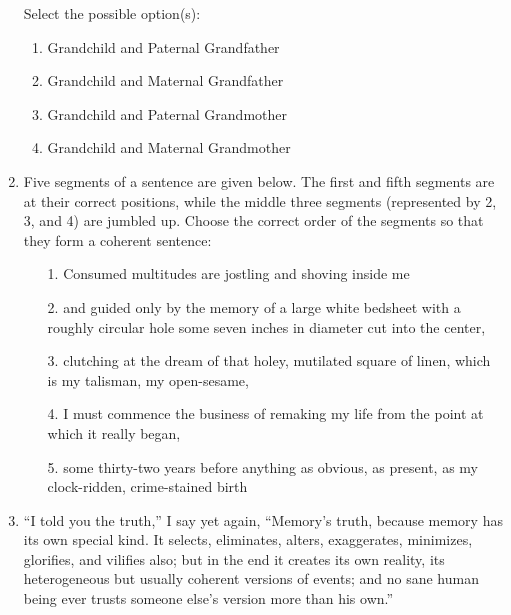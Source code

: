 \documentclass[12pt]{article}
\theoremstyle{remark}
\begin{document}
\begin{enumerate}
Select the possible option(s):\\ 
\begin{enumerate} 
\item   Grandchild and Paternal Grandfather 
\item   Grandchild and Maternal Grandfather 
\item   Grandchild and Paternal Grandmother 
\item   Grandchild and Maternal Grandmother 
\end{enumerate}
\hfill{}
\item Five segments of a sentence are given below. The first and fifth segments are at their correct positions, while the middle three segments (represented by 2, 3, and 4) are jumbled up. Choose the correct order of the segments so that they form a coherent sentence:
\begin{enumerate} 
\item[1.]  Consumed multitudes are jostling and shoving inside me
\item[2.]  and guided only by the memory of a large white bedsheet with a roughly circular hole some seven inches in diameter cut into the center,
\item[3.]  clutching at the dream of that holey, mutilated square of linen, which is my talisman, my open-sesame, 
\item[4.]  I must commence the business of remaking my life from the point at which it really began,
\item[5.]  some thirty-two years before anything as obvious, as present, as my clock-ridden, crime-stained birth
\end{enumerate}
\begin{enumerate}  \end{enumerate}
\hfill{}
\item  “I told you the truth,” I say yet again, “Memory’s truth, because memory has its own special kind. It selects, eliminates, alters, exaggerates, minimizes, glorifies, and vilifies also; but in the end it creates its own reality, its heterogeneous but usually coherent versions of events; and no sane human being ever trusts someone else’s version more than his own.”

\end{enumerate}
\end{document}
